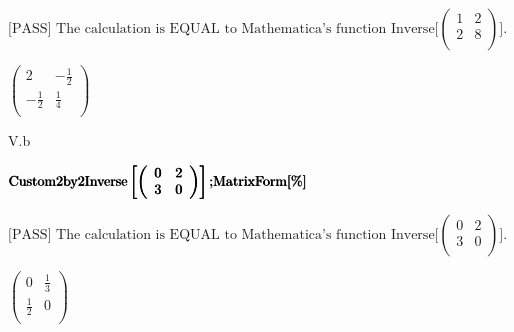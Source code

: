 \documentclass[11pt,a4paper]{article}
\begin{document}
\begin{doublespace}
\\
\\
\\
\pmb{];}\\
\pmb{];}\\
\\
\)
\end{doublespace}

\noindent\(\text{[PASS] The calculation is EQUAL to Mathematica's function Inverse[}\left(
\begin{array}{cc}
 1 & 2 \\
 2 & 8 \\
\end{array}
\right)\text{].}\)

\begin{doublespace}
\noindent\(\left(
\begin{array}{cc}
 2 & -\frac{1}{2} \\
 -\frac{1}{2} & \frac{1}{4} \\
\end{array}
\right)\)
\end{doublespace}

\hfill \break
V.b\\
\begin{doublespace}
\noindent\(\pmb{\text{Custom2by2Inverse}\left[\left(
\begin{array}{cc}
 0 & 2 \\
 3 & 0 \\
\end{array}
\right)\right];}\\
\pmb{\text{MatrixForm}[\%]}\)
\end{doublespace}

\noindent\(\text{[PASS] The calculation is EQUAL to Mathematica's function Inverse[}\left(
\begin{array}{cc}
 0 & 2 \\
 3 & 0 \\
\end{array}
\right)\text{].}\)

\begin{doublespace}
\noindent\(\left(
\begin{array}{cc}
 0 & \frac{1}{3} \\
 \frac{1}{2} & 0 \\
\end{array}
\right)\)
\end{doublespace}
\end{document}
